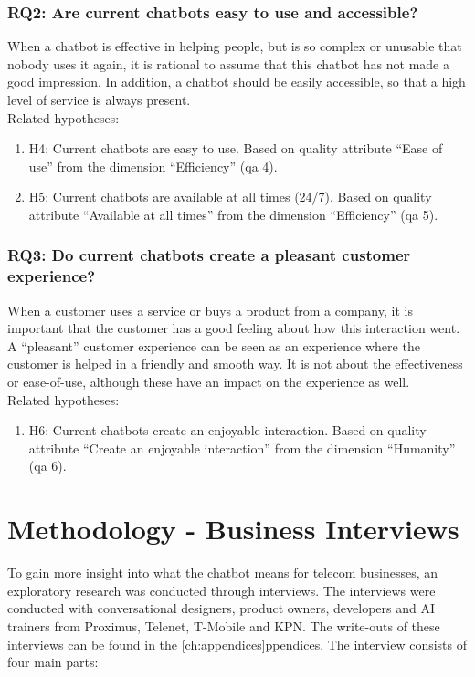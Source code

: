 \subsubsection{RQ2: Are current chatbots easy to use and accessible?}
When a chatbot is effective in helping people, but is so complex or unusable that nobody uses it again, it is rational to assume that this chatbot has not made a good impression. In addition, a chatbot should be easily accessible, so that a high level of service is always present.\\
\break
\break
Related hypotheses:
\begin{enumerate}
	\setlength\itemsep{-0.1em}
	\item H4: Current  chatbots are easy to use. Based on \citeauthor{Verkeyn2018} quality attribute “Ease of use” from the dimension “Efficiency” \citep{Candela2018, Duijst2017} (\acrshort{qa} 4).
	\item H5: Current  chatbots are available at all times (24/7). Based on \citeauthor{Verkeyn2018} quality attribute “Available at all times” from the dimension “Efficiency” \citep{Wang2019} (\acrshort{qa} 5).
\end{enumerate}

\subsubsection{RQ3: Do current chatbots create a pleasant customer experience?}
When a customer uses a service or buys a product from a company, it is important that the customer has a good feeling about how this interaction went.\\
\break
A “pleasant” customer experience can be seen as an experience where the customer is helped in a friendly and smooth way. It is not about the effectiveness or ease-of-use, although these have an impact on the experience as well. \\
\break
\break
Related hypotheses:
\begin{enumerate}
	\setlength\itemsep{-0.1em}
	\item H6: Current chatbots create an enjoyable interaction. Based on \citeauthor{Verkeyn2018} quality attribute “Create an enjoyable interaction” from the dimension “Humanity” \citep{Morrissey2013} (\acrshort{qa} 6).
\end{enumerate}

\section{Methodology - Business Interviews}
To gain more insight into what the chatbot means for telecom businesses, an exploratory research was conducted through interviews. The interviews were conducted with conversational designers, product owners, developers and AI trainers from Proximus, Telenet, T-Mobile and KPN. The write-outs of these interviews can be found in the \ref{ch:appendices}ppendices. The interview consists of four main parts:

